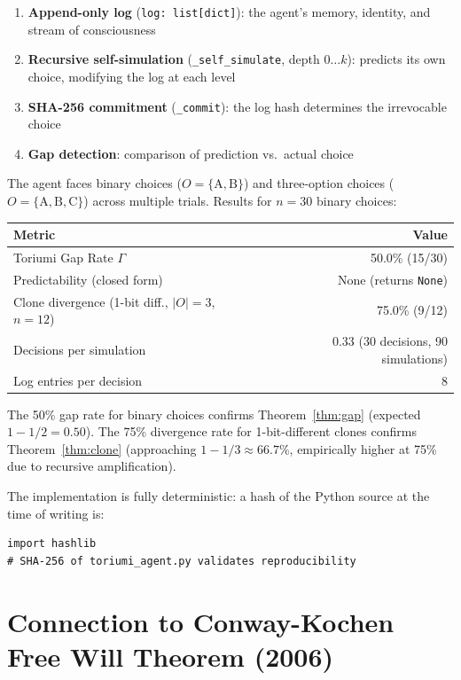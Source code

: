 \documentclass[12pt,a4paper]{article}
\theoremstyle{definition}
\theoremstyle{remark}
\begin{document}
\begin{enumerate}[itemsep=0pt]
\item \textbf{Append-only log} (\texttt{log: list[dict]}): the agent's memory,
  identity, and stream of consciousness
\item \textbf{Recursive self-simulation} (\texttt{\_self\_simulate}, depth
  $0 \ldots k$): predicts its own choice, modifying the log at each level
\item \textbf{SHA-256 commitment} (\texttt{\_commit}): the log hash determines
  the irrevocable choice
\item \textbf{Gap detection}: comparison of prediction vs.\ actual choice
\end{enumerate}

The agent faces binary choices ($O = \{\text{A}, \text{B}\}$) and three-option
choices ($O = \{\text{A}, \text{B}, \text{C}\}$) across multiple trials.
Results for $n=30$ binary choices:

\begin{center}
\begin{tabular}{lr}
\toprule
\textbf{Metric} & \textbf{Value} \\
\midrule
Toriumi Gap Rate $\Gamma$ & 50.0\% (15/30) \\
Predictability (closed form) & None (returns \texttt{None}) \\
Clone divergence (1-bit diff., $|O|=3$, $n=12$) & 75.0\% (9/12) \\
Decisions per simulation & 0.33 (30 decisions, 90 simulations) \\
Log entries per decision & 8 \\
\bottomrule
\end{tabular}
\end{center}

The 50\% gap rate for binary choices confirms Theorem~\ref{thm:gap}
(expected $1 - 1/2 = 0.50$). The 75\% divergence rate for 1-bit-different
clones confirms Theorem~\ref{thm:clone} (approaching $1 - 1/3 \approx 66.7\%$,
empirically higher at 75\% due to recursive amplification).

The implementation is fully deterministic: a hash of the Python source at the
time of writing is:
\begin{verbatim}
import hashlib
# SHA-256 of toriumi_agent.py validates reproducibility
\end{verbatim}

\section{Connection to Conway-Kochen Free Will Theorem (2006)}
\end{document}
